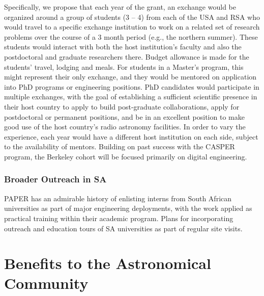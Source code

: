 \documentclass[preprint]{aastex}
\begin{document}
Specifically, we propose that each year of the grant, an exchange would be organized around a group of students (3 – 4) from each of the USA and RSA who would travel to a specific exchange institution to work on a related set of research problems over the course of a 3 month period (e.g., the northern summer).  These students would interact with both the host institution’s faculty and also the postdoctoral and graduate researchers there.  Budget allowance is made for the students' travel, lodging and meals.  For students in a Master’s program, this might represent their only exchange, and they would be mentored on application into PhD programs or engineering positions.  PhD candidates would participate in multiple exchanges, with the goal of establishing a sufficient scientific presence in their host country to apply to build post-graduate collaborations, apply for postdoctoral or permanent positions, and be in an excellent position to make good use of the host country’s radio astronomy facilities.  In order to vary the experience, each year would have a different host institution on each side, subject to the availability of mentors.  Building on past success with the CASPER program, the Berkeley cohort will be focused primarily on digital engineering.  

\subsubsection{Broader Outreach in SA}

PAPER has an admirable history of enlisting interns from South African universities as part of major engineering deployments, with the work applied as practical training within their academic program.
Plans for incorporating outreach and education tours of SA universities as part of regular site visits.




\section{Benefits to the Astronomical Community}
\end{document}
